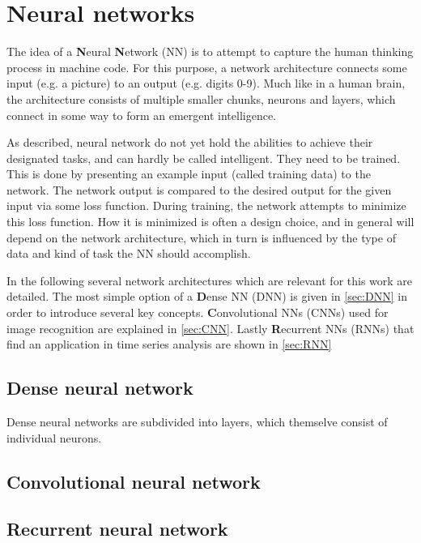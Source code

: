 
\chapter{Neural networks}
\label{chap:neural-networks}

The idea of a \textbf{N}eural \textbf{N}etwork (NN) is to attempt to capture the human thinking process in machine code. For this purpose, a network architecture
connects some input (e.g. a picture) to an output (e.g. digits 0-9). Much like in a human brain, the architecture consists of multiple smaller chunks, neurons 
and layers, which connect in some way to form an emergent intelligence. 

As described, neural network do not yet hold the abilities to achieve their designated tasks, and can hardly be called intelligent. They need to be trained. 
This is done by presenting an example input (called training data) to the network. The network output is compared to the desired output for the given input via 
some loss function. During training, the network attempts to minimize this loss function. How it is minimized is often a design choice, and in general will 
depend on the network architecture, which in turn is influenced by the type of data and kind of task the NN should accomplish.

In the following several network architectures which are relevant for this work are detailed. The most simple option of a \textbf{D}ense NN (DNN) is given in 
\autoref{sec:DNN} in order to introduce several key concepts. \textbf{C}onvolutional NNs (CNNs) used for image recognition are explained in \autoref{sec:CNN}. 
Lastly \textbf{R}ecurrent NNs (RNNs) that find an application in time series analysis are shown in \autoref{sec:RNN}

\section{Dense neural network}
\label{sec:DNN}

Dense neural networks are subdivided into layers, which themselve consist of individual neurons.


\section{Convolutional neural network}
\label{sec:CNN}

\section{Recurrent neural network}
\label{sec:RNN}